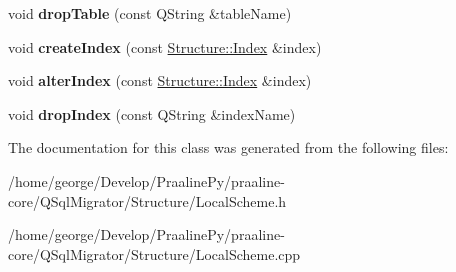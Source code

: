 \begin{DoxyCompactItemize}
void {\bfseries drop\+Table} (const Q\+String \&table\+Name)
\item 
\mbox{\label{class_q_sql_migrator_1_1_structure_1_1_local_scheme_a47fe31b2dfc44a067e564404b13c78bf}} 
void {\bfseries create\+Index} (const \hyperlink{class_q_sql_migrator_1_1_structure_1_1_index}{Structure\+::\+Index} \&index)
\item 
\mbox{\label{class_q_sql_migrator_1_1_structure_1_1_local_scheme_a9199a3d15e5b2a84b8ebee48eb4d90ee}} 
void {\bfseries alter\+Index} (const \hyperlink{class_q_sql_migrator_1_1_structure_1_1_index}{Structure\+::\+Index} \&index)
\item 
\mbox{\label{class_q_sql_migrator_1_1_structure_1_1_local_scheme_ae9acd7d0ff78128fef8c1dbec69935b4}} 
void {\bfseries drop\+Index} (const Q\+String \&index\+Name)
\end{DoxyCompactItemize}


The documentation for this class was generated from the following files\+:\begin{DoxyCompactItemize}
\item 
/home/george/\+Develop/\+Praaline\+Py/praaline-\/core/\+Q\+Sql\+Migrator/\+Structure/Local\+Scheme.\+h\item 
/home/george/\+Develop/\+Praaline\+Py/praaline-\/core/\+Q\+Sql\+Migrator/\+Structure/Local\+Scheme.\+cpp\end{DoxyCompactItemize}
